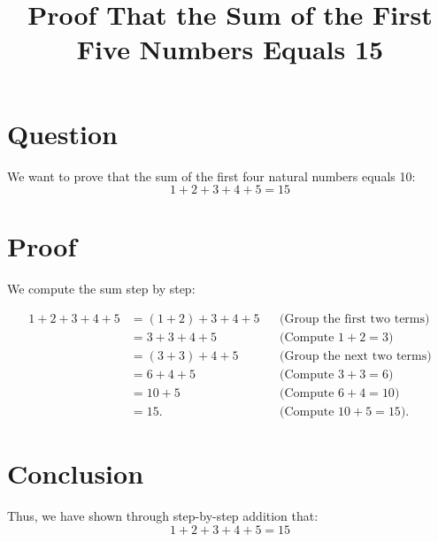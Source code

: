 \documentclass{article}
\begin{document}
\title{Proof That the Sum of the First Five Numbers Equals 15}
\maketitle

\section{Question}
We want to prove that the sum of the first four natural numbers equals 10:
\[ 1 + 2 + 3 + 4+5 = 15 \]

\section{Proof}
We compute the sum step by step:

\begin{align*}
1 + 2 + 3 + 4 + 5 &= (1 + 2) + 3 + 4 +5 && \text{(Group the first two terms)} \\
              &= 3 + 3 + 4 + 5         && \text{(Compute } 1 + 2 = 3\text{)} \\
              &= (3 + 3) + 4 +5       && \text{(Group the next two terms)} \\
              &= 6 + 4 + 5            && \text{(Compute } 3 + 3 = 6\text{)} \\
              &= 10 +5               && \text{(Compute } 6 + 4 = 10\text{)} \\
              &= 15.                    && \text{(Compute } 10 + 5 = 15\text{)}. 
\end{align*}

\section{Conclusion}
Thus, we have shown through step-by-step addition that:
\[ 1 + 2 + 3 + 4 + 5= 15 \]
\end{document}
